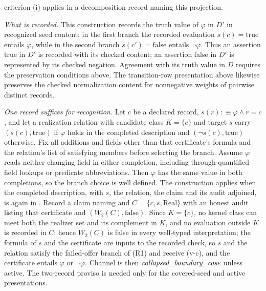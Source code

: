 \begin{remark}
criterion (i) applies in a decomposition record naming this projection. \par\emph{What is recorded.} This construction records the truth value of \(\varphi\) in \(D'\) in recognized
seed content: in the first branch the recorded evaluation \(s(c)=\mathrm{true}\)
entails \(\varphi\), while in the second branch \(s(c')=\mathrm{false}\) entails
\(\neg\varphi\). Thus an assertion true in \(D'\) is recorded with its checked content; an assertion false in \(D'\) is represented by its checked negation. Agreement with its truth value in \(D\) requires the preservation conditions above. The transition-row
presentation above likewise preserves the checked normalization content for
nonnegative weights of pairwise distinct records.

\emph{One record suffices for recognition.} Let \(c\) be a declared record, \(s(r):\equiv\varphi\wedge r=c\), and let a realization relation with candidate class \(K=\{c\}\) and target \(s\) carry \((s(c),\mathrm{true})\) if \(\varphi\) holds in the completed description and \((\neg s(c),\mathrm{true})\) otherwise. Fix all additions and fields other than that certificate's formula and the relation's list of satisfying members before selecting the branch. Assume \(\varphi\) reads neither changing field in either completion, including through quantified field lookups or predicate abbreviations. Then \(\varphi\) has the same value in both completions, so the branch choice is well defined. The construction applies when the completed description, with \(s\), the relation, the claim and its audit adjoined, is again in \FATCD{}. Record a claim naming \Ptwo{} and \(C=\{c,s,\mathrm{Real}\}\) with an honest audit listing that certificate and \((W_2(C),\mathrm{false})\). Since \(K=\{c\}\), no kernel class can meet both the realizer set and its complement in \(K\), and no evaluation outside \(K\) is recorded in \(C\); hence \(W_2(C)\) is false in every well-typed interpretation; the formula of \(s\) and the certificate are inputs to the recorded check, so \(s\) and the relation satisfy the failed-offer branch of (R1) and receive (v-c), and the certificate entails \(\varphi\) or \(\neg\varphi\). Channel \Ptwo{} is then \(\textit{collapsed\_\allowbreak boundary\_\allowbreak case}\) unless active. The two-record proviso is needed only for the covered-seed and active presentations.


\end{remark}
